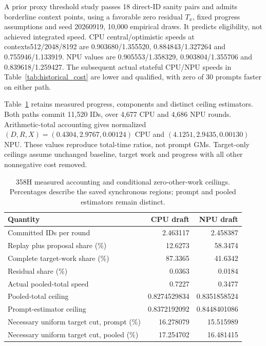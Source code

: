 A prior proxy threshold study passes 18 direct-ID sanity pairs and admits borderline context points, using a favorable zero residual $T_x$, fixed progress assumptions and seed 20260919, 10,000 empirical draws. It predicts eligibility, not achieved integrated speed. CPU central/optimistic speeds at contexts512/2048/8192 are 0.903680/1.355520, 0.884843/1.327264 and 0.755946/1.133919. NPU values are 0.905553/1.358329, 0.903804/1.355706 and 0.839618/1.259427. The subsequent actual stateful CPU/NPU speeds in Table~\ref{tab:historical_cost} are lower and qualified, with zero of 30 prompts faster on either path.

Table~\ref{tab:358h_accounting} retains measured progress, components and distinct ceiling estimators. Both paths commit 11,520 IDs, over 4,677 CPU and 4,686 NPU rounds. Arithmetic-total accounting gives normalized $(D,R,X)=(0.4304,2.9767,0.00124)$ CPU and $(4.1251,2.9435,0.00130)$ NPU. These values reproduce total-time ratios, not prompt GMs. Target-only ceilings assume unchanged baseline, target work and progress with all other nonnegative cost removed.

\begin{table}[ht]\centering\small
\caption{358H measured accounting and conditional zero-other-work ceilings. Percentages describe the saved synchronous regions; prompt and pooled estimators remain distinct.}
\label{tab:358h_accounting}
\begin{tabular}{@{}lrr@{}}\toprule
Quantity & CPU draft & NPU draft\\\midrule
Committed IDs per round & 2.463117 & 2.458387\\
Replay plus proposal share (\%) & 12.6273 & 58.3474\\
Complete target-work share (\%) & 87.3365 & 41.6342\\
Residual share (\%) & 0.0363 & 0.0184\\
Actual pooled-total speed & 0.7227 & 0.3477\\
Pooled-total ceiling & 0.8274529834 & 0.8351858524\\
Prompt-estimator ceiling & 0.8372192092 & 0.8448401086\\
Necessary uniform target cut, prompt (\%) & 16.278079 & 15.515989\\
Necessary uniform target cut, pooled (\%) & 17.254702 & 16.481415\\\bottomrule
\end{tabular}
\end{table}

